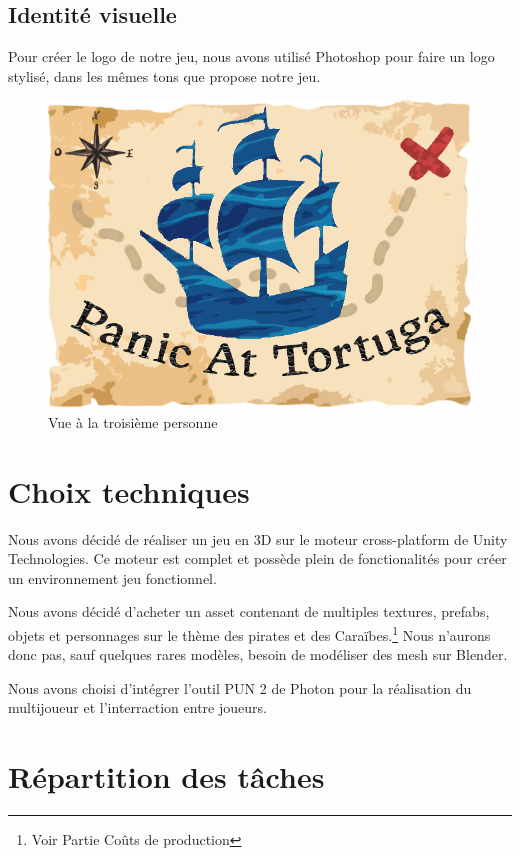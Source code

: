 \documentclass[french, 12pt]{article}
\begin{document}
\subsection{Identité visuelle}
Pour créer le logo de notre jeu, nous avons utilisé Photoshop pour faire un logo stylisé, dans les mêmes tons que propose notre jeu.
\begin{figure}[hbt!]
    \centering
    \includegraphics[scale=0.5]{logo.png}
    \caption{Vue à la troisième personne}
\end{figure}

\section{Choix techniques}

Nous avons décidé de réaliser un jeu en 3D sur le moteur cross-platform de Unity Technologies.
Ce moteur est complet et possède plein de fonctionalités pour créer un environnement jeu fonctionnel.

Nous avons décidé d'acheter un asset contenant de multiples textures, prefabs, objets et personnages sur le thème des pirates et des Caraïbes.\footnote{Voir Partie Coûts de production}
Nous n'aurons donc pas, sauf quelques rares modèles, besoin de modéliser des mesh sur Blender.

Nous avons choisi d'intégrer l'outil PUN 2 de Photon pour la réalisation du multijoueur et l'interraction entre joueurs.


\section{Répartition des tâches}
\end{document}
